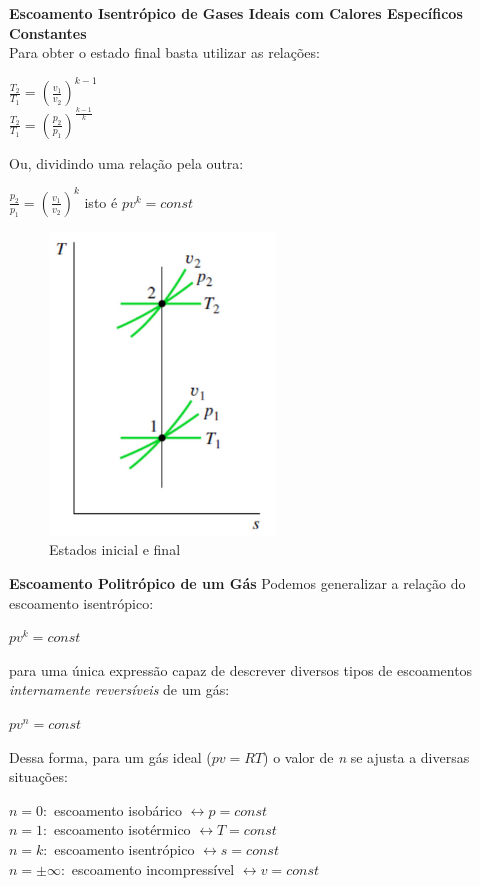 \documentclass[a4paper, 12pt]{article}
\begin{document}
\textbf{Escoamento Isentrópico de Gases Ideais com Calores Específicos Constantes}\\
Para obter o estado final basta utilizar as relações:
	\begin{center}
		\large
		$ \frac{T_2}{T_1} = (\frac{v_1}{v_2})^{k - 1} $\\
		$ \frac{T_2}{T_1} = (\frac{p_2}{p_1})^{\frac{k-1}{k}} $
	\end{center}

Ou, dividindo uma relação pela outra:
	\begin{center}
		\large
		$ \frac{p_2}{p_1} = (\frac{v_1}{v_2})^k $ isto é $ pv^k = const $
	\end{center}

	\begin{figure}[h]
		\includegraphics[width = 6cm]{BB.png}
		\centering
		\caption{Estados inicial e final}
	\end{figure}

\newpage
\textbf{Escoamento Politrópico de um Gás}
Podemos generalizar a relação do escoamento isentrópico:
	\begin{center}
		\large
		$ pv^k = const $
	\end{center}
para uma única expressão capaz de descrever diversos tipos de escoamentos
\textit{internamente reversíveis} de um gás:
	\begin{center}
		\large
		$ pv^n = const $
	\end{center}

Dessa forma, para um gás ideal ($ pv = RT $) o valor de \textit{n} se ajusta a diversas
situações:
	\begin{center}
		$ n = 0: $ escoamento isobárico $ \leftrightarrow p = const $\\
		$ n = 1: $ escoamento isotérmico $ \leftrightarrow T = const $\\
		$ n = k: $ escoamento isentrópico $ \leftrightarrow s = const $\\
		$ n = \pm \infty: $ escoamento incompressível $ \leftrightarrow v = const $\\
	\end{center}
\end{document}
